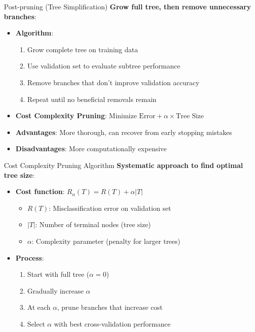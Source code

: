 \documentclass[usenames,dvipsnames]{beamer}
\begin{document}
\begin{frame}{Post-pruning (Tree Simplification)}
\textbf{Grow full tree, then remove unnecessary branches}:
\begin{itemize}[<+->]
\item \textbf{Algorithm}:
    \begin{enumerate}
    \item Grow complete tree on training data
    \item Use validation set to evaluate subtree performance
    \item Remove branches that don't improve validation accuracy
    \item Repeat until no beneficial removals remain
    \end{enumerate}
\item \textbf{Cost Complexity Pruning}: Minimize $\text{Error} + \alpha \times \text{Tree Size}$
\item \textbf{Advantages}: More thorough, can recover from early stopping mistakes
\item \textbf{Disadvantages}: More computationally expensive
\end{itemize}
\end{frame}

\begin{frame}{Cost Complexity Pruning Algorithm}
\textbf{Systematic approach to find optimal tree size}:
\begin{itemize}[<+->]
\item \textbf{Cost function}: $R_\alpha(T) = R(T) + \alpha |T|$
    \begin{itemize}
    \item $R(T)$: Misclassification error on validation set
    \item $|T|$: Number of terminal nodes (tree size)
    \item $\alpha$: Complexity parameter (penalty for larger trees)
    \end{itemize}
\item \textbf{Process}:
    \begin{enumerate}
    \item Start with full tree ($\alpha = 0$)
    \item Gradually increase $\alpha$
    \item At each $\alpha$, prune branches that increase cost
    \item Select $\alpha$ with best cross-validation performance
    \end{enumerate}
\end{itemize}
\end{frame}
\end{document}
